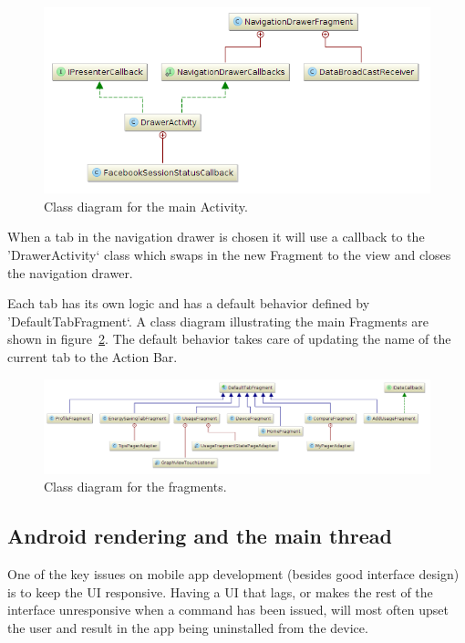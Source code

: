 \begin{figure}[H]
\includegraphics[width=\textwidth]{ch/architecture/fig/class_diagram_drawer.png}
\caption{Class diagram for the main Activity.}
\label{fig:classDiagramDrawer}
\end{figure}

When a tab in the navigation drawer is chosen it will use a callback to the 'DrawerActivity` class which swaps in the new Fragment to the view and closes the navigation drawer.

Each tab has its own logic and has a default behavior defined by 'DefaultTabFragment`. A class diagram illustrating the main Fragments are shown in figure~\ref{fig:classDiagramFragments}. The default behavior takes care of updating the name of the current tab to the Action Bar.

\begin{figure}[H]
\includegraphics[width=\textwidth]{ch/architecture/fig/class_diagram_fragments.png}
\caption{Class diagram for the fragments.}
\label{fig:classDiagramFragments}
\end{figure}

\subsection{Android rendering and the main thread}

One of the key issues on mobile app development (besides good interface design) is to keep the \gls{UI} responsive. Having a UI that lags, or makes the rest of the interface unresponsive when a command has been issued, will most often upset the user and result in the app being uninstalled from the device.

